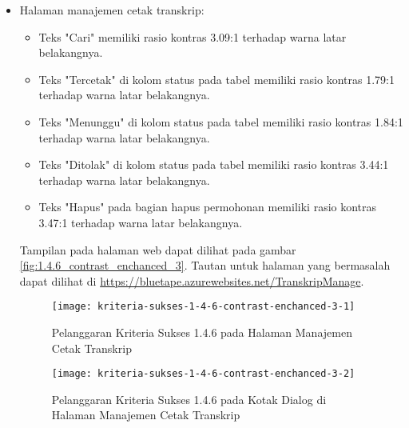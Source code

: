 \begin{itemize}
    \item Halaman manajemen cetak transkrip: 
    \begin{itemize}
        \item Teks "Cari" memiliki rasio kontras 3.09:1 terhadap warna latar belakangnya.
        \item Teks "Tercetak" di kolom status pada tabel memiliki rasio kontras 1.79:1 terhadap warna latar belakangnya.
        \item Teks "Menunggu" di kolom status pada tabel memiliki rasio kontras 1.84:1 terhadap warna latar belakangnya.
        \item Teks "Ditolak" di kolom status pada tabel memiliki rasio kontras 3.44:1 terhadap warna latar belakangnya.
        \item Teks "Hapus" pada bagian hapus permohonan memiliki rasio kontras 3.47:1 terhadap warna latar belakangnya.
    \end{itemize}
    Tampilan pada halaman web dapat dilihat pada gambar \ref{fig:1.4.6_contrast_enchanced_3}. Tautan untuk halaman yang bermasalah dapat dilihat di \url{https://bluetape.azurewebsites.net/TranskripManage}.
    \begin{figure}[H]
        \centering  
        \texttt{[image: kriteria-sukses-1-4-6-contrast-enchanced-3-1]}  
        \caption[Pelanggaran Kriteria Sukses 1.4.6 pada Halaman Manajemen Cetak Transkrip ]{Pelanggaran Kriteria Sukses 1.4.6 pada Halaman Manajemen Cetak Transkrip}
        \label{fig:1.4.6_contrast_enchanced_3_1}  
    \end{figure} 
    
    \begin{figure}[H]
        \centering  
        \texttt{[image: kriteria-sukses-1-4-6-contrast-enchanced-3-2]}  
        \caption[Pelanggaran Kriteria Sukses 1.4.6 pada Kotak Dialog di Halaman Manajemen Cetak Transkrip]{Pelanggaran Kriteria Sukses 1.4.6 pada Kotak Dialog di Halaman Manajemen Cetak Transkrip}
        \label{fig:1.4.6_contrast_enchanced_3_2}  
    \end{figure} 


\end{itemize}
